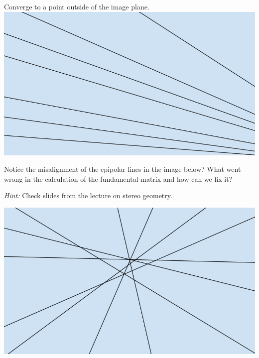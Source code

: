 \documentclass{csci1430}
\begin{document}
\pagebreak
\begin{subquestion}[points=1]
Converge to a point outside of the image plane.\\
\includegraphics[width = 0.5\linewidth]{images/epipolarlines-b.PNG}
\end{subquestion}

\begin{answer}[height=12]
\end{answer}

\begin{subquestion}[points=1]
Notice the misalignment of the epipolar lines in the image below? What went wrong in the calculation of the fundamental matrix and how can we fix it?

\textit{Hint:} Check slides from the lecture on stereo geometry.

\includegraphics[width = 0.5\linewidth]{images/epipolarlines-c.PNG}
\end{subquestion}

\begin{answer}[height=7]
\end{answer}
\end{document}
